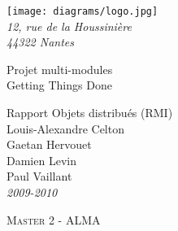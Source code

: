 \begin{titlepage}

\vspace*{2cm}



\begin{flushleft}
	\hspace{1cm} \texttt{[image: diagrams/logo.jpg]}\\
	\hspace{1cm} \textsl{12, rue de la Houssinière}\\
	\hspace{1cm} \textit{44322 Nantes}
	\hrulefill
\end{flushleft}




\vspace{2cm}

\begin{flushright}

	{\fontsize{1.4cm}{1.65cm}\selectfont 
Projet multi-modules } 	 \\
	{\fontsize{0.7cm}{0.825cm}\selectfont 
Getting Things Done} 	 \\

	
	\vspace{1cm}
	
	{\Large 
	Rapport Objets distribués (RMI)
	}\\
	
	\vspace{1cm}
	Louis-Alexandre Celton \\
	Gaetan Hervouet \\
	Damien Levin \\
	Paul Vaillant \\
	\textit{2009-2010}
	
\end{flushright}


\vspace{2cm}

\begin{flushleft}



	\hspace{1cm} \textsc{Master 2 - ALMA}\\
	
\end{flushleft}

\hspace*{0,5cm}\hrulefill
\end{titlepage}
